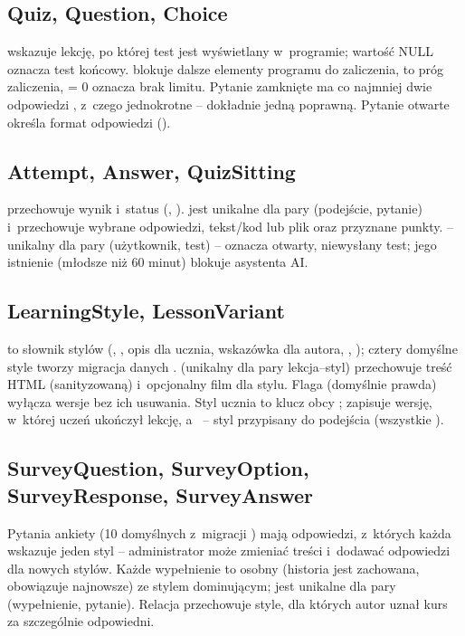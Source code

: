 \subsection{Quiz, Question, Choice}
 wskazuje lekcję, po której test jest wyświetlany w~programie;
wartość NULL oznacza test końcowy.  blokuje dalsze elementy programu
do zaliczenia,  to próg zaliczenia,  = 0 oznacza
brak limitu. Pytanie zamknięte ma co najmniej dwie odpowiedzi , z~czego
jednokrotne -- dokładnie jedną poprawną. Pytanie otwarte określa format odpowiedzi
().

\subsection{Attempt, Answer, QuizSitting}
 przechowuje wynik i~status (, ).
 jest unikalne dla pary (podejście, pytanie) i~przechowuje wybrane odpowiedzi,
tekst/kod lub plik oraz przyznane punkty.  -- unikalny dla pary
(użytkownik, test) -- oznacza otwarty, niewysłany test; jego istnienie (młodsze niż
60 minut) blokuje asystenta AI.

\subsection{LearningStyle, LessonVariant}
 to słownik stylów (, , opis dla ucznia, wskazówka dla
autora, , ); cztery domyślne style tworzy migracja danych
.  (unikalny dla pary lekcja--styl) przechowuje treść
HTML (sanityzowaną) i~opcjonalny film dla stylu. Flaga 
(domyślnie prawda) wyłącza wersje bez ich usuwania. Styl ucznia to klucz obcy
;  zapisuje wersję, w~której uczeń
ukończył lekcję, a~ -- styl przypisany do podejścia (wszystkie
).

\subsection{SurveyQuestion, SurveyOption, SurveyResponse, SurveyAnswer}
Pytania ankiety (10 domyślnych z~migracji ) mają odpowiedzi, z~których każda
wskazuje jeden styl -- administrator może zmieniać treści i~dodawać odpowiedzi dla nowych stylów.
Każde wypełnienie to osobny  (historia jest zachowana, obowiązuje najnowsze)
ze stylem dominującym;  jest unikalne dla pary (wypełnienie, pytanie).
Relacja  przechowuje style, dla których autor uznał kurs za
szczególnie odpowiedni.

